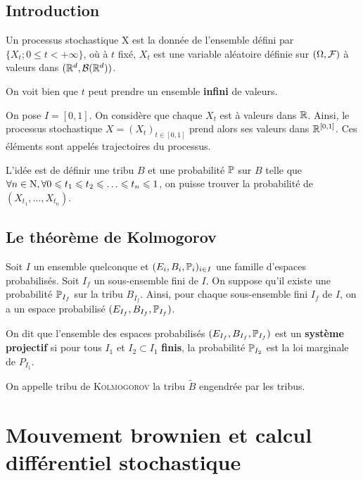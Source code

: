 \section{Introduction}
\begin{definition}
  Un processus stochastique X est la donnée de l'ensemble défini par $\{X_t; 0\leq t < +\infty\}$, où à $t$ fixé, $X_t$ est une variable aléatoire définie sur $(\Omega,\F)$ à valeurs dans $(\R^d,\B(\R^d))$.
\end{definition}

\Rq On voit bien que $t$ peut prendre un ensemble \textbf{infini} de valeurs.

\begin{ex}
  On pose $I=[0,1]$. On considère que chaque $X_t$ est à valeurs dans $\R$. Ainsi, le processus stochastique $X=(X_t)_{t \in [0,1]}$ prend alors ses valeurs dans $\R^{[0,1]}$. Ces éléments sont appelés \og trajectoires \fg{} du processus.
\end{ex}

L'idée est de définir une tribu $B$ et une probabilité $\P$ sur $B$ telle que $\forall n \in \N, \forall 0\leq t_1 \leq t_2 \leq \ldots \leq t_n \leq 1$, on puisse trouver la probabilité de $(X_{t_1}, \ldots, X_{t_n})$.

\section{Le théorème de Kolmogorov}
Soit $I$ un ensemble quelconque et $(E_i, B_i, \P_i)_{i \in I}$ une famille d'espaces probabilisés. Soit $I_f$ un sous-ensemble fini de $I$. On suppose qu'il existe une probabilité $\P_{I_f}$ sur la tribu $B_{I_f}$. Ainsi, pour chaque sous-ensemble fini $I_f$ de $I$, on a un espace probabilisé $(E_{I_f}, B_{I_f}, \P_{I_f})$.

\begin{definition}
  On dit que l'ensemble des espaces probabilisés $(E_{I_f}, B_{I_f}, \P_{I_f})$ est un \textbf{système projectif} si pour tous $I_1$ et $I_2 \subset I_1$ \textbf{finis}, la probabilité $\P_{I_2}$ est la loi marginale de $P_{I_1}$.
\end{definition}

\begin{definition}
  On appelle tribu de \textsc{Kolmogorov} la tribu $\widetilde{B}$ engendrée par les tribus.
\end{definition}

\chapter{Mouvement brownien et calcul différentiel stochastique}
